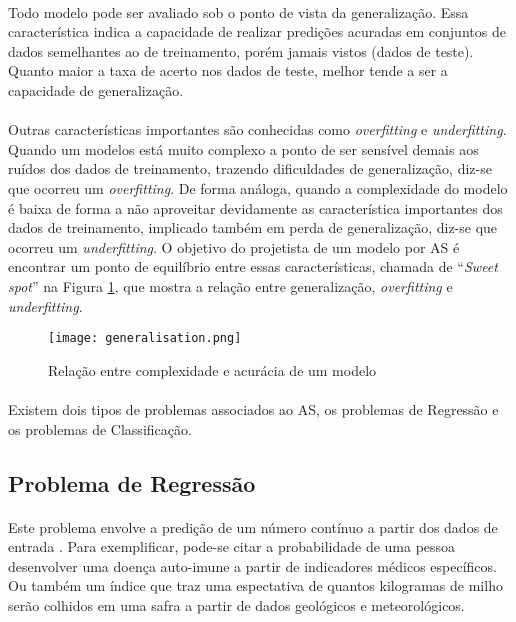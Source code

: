 \paragraph{} Todo modelo pode ser avaliado sob o ponto de vista da generalização. Essa característica indica a capacidade de realizar predições acuradas em conjuntos de dados semelhantes ao de treinamento, porém jamais vistos (dados de teste). Quanto maior a taxa de acerto nos dados de teste, melhor tende a ser a capacidade de generalização.

\paragraph{} Outras características importantes são conhecidas como \textit{overfitting} e \textit{underfitting}. Quando um modelos está muito complexo a ponto de ser sensível demais aos ruídos dos dados de treinamento, trazendo dificuldades de generalização, diz-se que ocorreu um \textit{overfitting}. De forma análoga, quando a complexidade do modelo é baixa de forma a não aproveitar devidamente as característica importantes dos dados de treinamento, implicado também em perda de generalização, diz-se que ocorreu um \textit{underfitting}. O objetivo do projetista de um modelo por AS é encontrar um ponto de equilíbrio entre essas características, chamada de ``\textit{Sweet spot}'' na Figura \ref{fig:6}, que mostra a relação entre generalização, \textit{overfitting} e \textit{underfitting}.

\begin{figure}[h]
    \texttt{[image: generalisation.png]}
    \centering
    \caption{Relação entre complexidade e acur\'acia de um modelo \cite{muller2016introduction}}
    \label{fig:6}
\end{figure}

\paragraph{} Existem dois tipos de problemas associados ao AS, os problemas de Regressão e os problemas de Classificação.


\subsection{Problema de Regressão}

\paragraph{} Este problema envolve a predição de um número contínuo a partir dos dados de entrada \cite{muller2016introduction}. Para exemplificar, pode-se citar a probabilidade de uma pessoa desenvolver uma doença auto-imune a partir de indicadores médicos específicos. Ou também um índice que traz uma espectativa de quantos kilogramas de milho serão colhidos em uma safra a partir de dados geológicos e meteorológicos.


